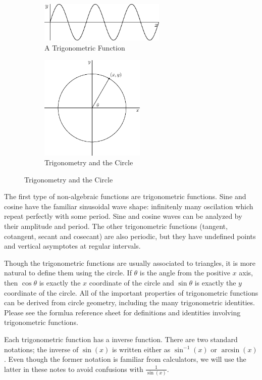 \documentclass[fleqn]{report}
\begin{document}
\begin{figure}[b]
\centering
\begin{subfigure}{.5\textwidth}
 \centering
 \includegraphics[width=6cm]{figure32.eps}
 \caption{A Trigonometric Function}
\end{subfigure}%
\begin{subfigure}{.5\textwidth}
 \centering
 \includegraphics[width=5cm]{figure34.eps}
 \caption{Trigonometry and the Circle}
\end{subfigure}
\label{Trigonometric Functions}
\end{figure}

The first type of non-algebraic functions are trigonometric
functions.  Sine and cosine have the familiar sinusoidal wave
shape: infinitenly many oscilation which repeat perfectly
with some period. Sine and cosine waves can be analyzed by
their amplitude and period. The other trigonometric functions
(tangent, cotangent, secant and cosecant) are also periodic,
but they have undefined points and vertical asymptotes at
regular intervals. 

Though the trigonometric functions are usually associated to triangles,
it is more natural to define them using the circle. If
$\theta$ is the angle from the positive $x$ axis, then $\cos
\theta$ is exactly the $x$ coordinate of the circle and $\sin
\theta$ is exactly the $y$ coordinate of the circle. All of
the important properties of trigonometric functions can be
derived from circle geometry, including the many trigonometric
identities. Please see the formlua reference sheet for
definitions and identities involving trigonometric functions.

Each trigonometric function has a inverse function. There are
two standard notations; the inverse of $\sin(x)$ is written
either as $\sin^{-1}(x)$ or $\arcsin(x)$. Even though the
former notation is familiar from calculators, we will use the
latter in these notes to avoid confusions with
$\frac{1}{\sin(x)}$.
\end{document}
